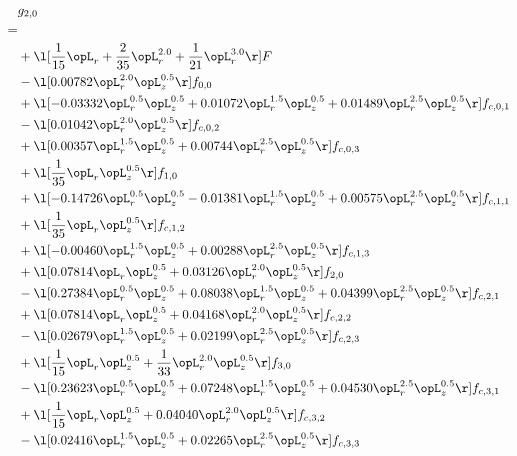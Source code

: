 \begin{alignat}{2} 
\label{eq:g_20_0} 
& g_{2,0} \nonumber \\ 
 = \\ 
& + \l[ \frac{1}{15} \opL_r + \frac{2}{35} \opL_r^{2.0} + \frac{1}{21} \opL_r^{3.0}  \r] F \nonumber \\ 
& - \l[  0.00782 \opL_r^{2.0} \opL_z^{0.5}  \r] f_{0,0} \nonumber \\ 
& + \l[  -0.03332 \opL_r^{0.5} \opL_z^{0.5} +  0.01072 \opL_r^{1.5} \opL_z^{0.5} +  0.01489 \opL_r^{2.5} \opL_z^{0.5}  \r] f_{c,0,1} \nonumber \\ 
& - \l[  0.01042 \opL_r^{2.0} \opL_z^{0.5}  \r] f_{c,0,2} \nonumber \\ 
& + \l[  0.00357 \opL_r^{1.5} \opL_z^{0.5} +  0.00744 \opL_r^{2.5} \opL_z^{0.5}  \r] f_{c,0,3} \nonumber \\ 
& + \l[ \frac{1}{35} \opL_r \opL_z^{0.5}  \r] f_{1,0} \nonumber \\ 
& + \l[  -0.14726 \opL_r^{0.5} \opL_z^{0.5}   -0.01381 \opL_r^{1.5} \opL_z^{0.5} +  0.00575 \opL_r^{2.5} \opL_z^{0.5}  \r] f_{c,1,1} \nonumber \\ 
& + \l[ \frac{1}{35} \opL_r \opL_z^{0.5}  \r] f_{c,1,2} \nonumber \\ 
& + \l[  -0.00460 \opL_r^{1.5} \opL_z^{0.5} +  0.00288 \opL_r^{2.5} \opL_z^{0.5}  \r] f_{c,1,3} \nonumber \\ 
& + \l[  0.07814 \opL_r \opL_z^{0.5} +  0.03126 \opL_r^{2.0} \opL_z^{0.5}  \r] f_{2,0} \nonumber \\ 
& - \l[  0.27384 \opL_r^{0.5} \opL_z^{0.5} +  0.08038 \opL_r^{1.5} \opL_z^{0.5} +  0.04399 \opL_r^{2.5} \opL_z^{0.5}  \r] f_{c,2,1} \nonumber \\ 
& + \l[  0.07814 \opL_r \opL_z^{0.5} +  0.04168 \opL_r^{2.0} \opL_z^{0.5}  \r] f_{c,2,2} \nonumber \\ 
& - \l[  0.02679 \opL_r^{1.5} \opL_z^{0.5} +  0.02199 \opL_r^{2.5} \opL_z^{0.5}  \r] f_{c,2,3} \nonumber \\ 
& + \l[ \frac{1}{15} \opL_r \opL_z^{0.5} + \frac{1}{33} \opL_r^{2.0} \opL_z^{0.5}  \r] f_{3,0} \nonumber \\ 
& - \l[  0.23623 \opL_r^{0.5} \opL_z^{0.5} +  0.07248 \opL_r^{1.5} \opL_z^{0.5} +  0.04530 \opL_r^{2.5} \opL_z^{0.5}  \r] f_{c,3,1} \nonumber \\ 
& + \l[ \frac{1}{15} \opL_r \opL_z^{0.5} +  0.04040 \opL_r^{2.0} \opL_z^{0.5}  \r] f_{c,3,2} \nonumber \\ 
& - \l[  0.02416 \opL_r^{1.5} \opL_z^{0.5} +  0.02265 \opL_r^{2.5} \opL_z^{0.5}  \r] f_{c,3,3} \nonumber \\ 
\end{alignat} 


